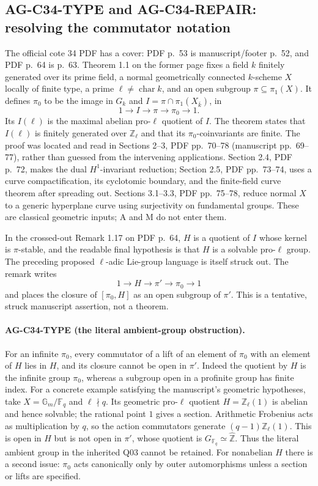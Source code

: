 \documentclass[11pt,a4paper]{article}
\begin{document}
\subsection{AG-C34-TYPE and AG-C34-REPAIR: resolving the commutator notation}
\label{ag:c34repair}

The official cote 34 PDF has a cover: PDF p.~53 is manuscript/footer
p.~52, and PDF p.~64 is p.~63. Theorem 1.1 on the former page fixes a
field $k$ finitely generated over its prime field, a normal geometrically
connected $k$-scheme $X$ locally of finite type, a prime
$\ell\ne\operatorname{char}k$, and an open subgroup
$\pi\subseteq\pi_1(X)$. It defines $\pi_0$ to be the image in
$G_k$ and $I=\pi\cap\pi_1(X_{\bar k})$, in
\[
 1\longrightarrow I\longrightarrow\pi\longrightarrow\pi_0
 \longrightarrow1.
\]
Its $I(\ell)$ is the maximal abelian pro-$\ell$ quotient of $I$.
The theorem states that $I(\ell)$ is finitely generated over
$\mathbb Z_\ell$ and that its $\pi_0$-coinvariants are finite.
The proof was located and read in Sections 2--3, PDF pp.~70--78
(manuscript pp.~69--77), rather than guessed from the intervening
applications. Section 2.4, PDF p.~72, makes the dual $H^1$-invariant
reduction; Section 2.5, PDF pp.~73--74, uses a curve compactification,
its cyclotomic boundary, and the finite-field curve theorem after
spreading out. Sections 3.1--3.3, PDF pp.~75--78, reduce normal $X$ to
a generic hyperplane curve using surjectivity on fundamental groups.
These are classical geometric inputs; A and M do not enter them.

In the crossed-out Remark 1.17 on PDF p.~64, $H$ is a quotient of $I$
whose kernel is $\pi$-stable, and the readable final hypothesis is that
$H$ is a solvable pro-$\ell$ group. The preceding proposed
$\ell$-adic Lie-group language is itself struck out. The remark writes
\[
 1\longrightarrow H\longrightarrow\pi'\longrightarrow\pi_0
 \longrightarrow1
\]
and places the closure of $[\pi_0,H]$ as an open subgroup of $\pi'$.
This is a tentative, struck manuscript assertion, not a theorem.

\paragraph{AG-C34-TYPE (the literal ambient-group obstruction).}
For an infinite $\pi_0$, every commutator of a lift of an element of
$\pi_0$ with an element of $H$ lies in $H$, and its closure cannot be
open in $\pi'$. Indeed the quotient by $H$ is the infinite group
$\pi_0$, whereas a subgroup open in a profinite group has finite index.
For a concrete example satisfying the manuscript's geometric hypotheses,
take $X=\mathbb G_m/\mathbb F_q$ and $\ell\nmid q$. Its geometric
pro-$\ell$ quotient $H=\mathbb Z_\ell(1)$ is abelian and hence
solvable; the rational point $1$ gives a section. Arithmetic Frobenius
acts as multiplication by $q$, so the action commutators generate
$(q-1)\mathbb Z_\ell(1)$. This is open in $H$ but is not open in
$\pi'$, whose quotient is $G_{\mathbb F_q}\simeq\widehat{\mathbb Z}$.
Thus the literal ambient group in the inherited Q03 cannot be retained.
For nonabelian $H$ there is a second issue: $\pi_0$ acts canonically
only by outer automorphisms unless a section or lifts are specified.
\end{document}

